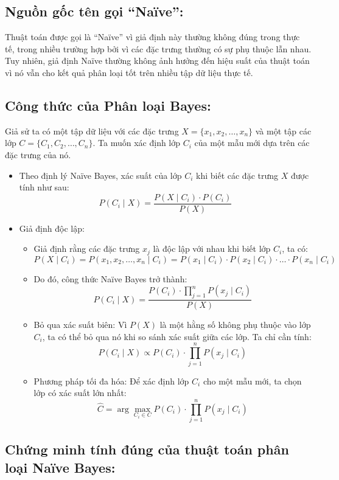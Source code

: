 \subsection{Nguồn gốc tên gọi “Naïve”:}

Thuật toán được gọi là “Naïve” vì giả định này thường không đúng trong thực tế, trong nhiều trường hợp bởi vì các đặc trưng thường có sự phụ thuộc lẫn nhau.
Tuy nhiên, giả định Naïve thường không ảnh hưởng đến hiệu suất của thuật toán vì nó vẫn cho kết quả phân loại tốt trên nhiều tập dữ liệu thực tế.

\subsection{Công thức của Phân loại Bayes:}

Giả sử ta có một tập dữ liệu với các đặc trưng $X = \{ x_1, x_2, \dots, x_n \}$ và một tập các lớp $C = \{ C_1, C_2, \dots, C_n \}$. 
Ta muốn xác định lớp $C_i$ của một mẫu mới dựa trên các đặc trưng của nó.
\begin{itemize}

    \item Theo định lý Naïve Bayes, xác suất của lớp $C_i$ khi biết các đặc trưng $X$ được tính như sau:
\[P(C_i \mid X) = \frac{P(X \mid C_i) \cdot P(C_i)}{P(X)}\]
    \item Giả định độc lập:
    \begin{itemize}
        \item Giả định rằng các đặc trưng $x_j$ là độc lập với nhau khi biết lớp $C_i$, ta có:
\[P(X \mid C_i) = P(x_1, x_2, \dots, x_n \mid C_i) = P(x_1 \mid C_i) \cdot P(x_2 \mid C_i) \cdot \dots \cdot P(x_n \mid C_i)\]
    \item Do đó, công thức Naïve Bayes trở thành:
\[P(C_i \mid X) = \frac{P(C_i) \cdot \prod_{j=1}^n P(x_j \mid C_i)}{P(X)}\]
    \item Bỏ qua xác suất biên: Vì $P(X)$ là một hằng số không phụ thuộc vào lớp $C_i$, ta có thể bỏ qua nó khi so sánh xác suất giữa các lớp. Ta chỉ cần tính:
\[P(C_i \mid X) \propto P(C_i) \cdot \prod_{j=1}^n P(x_j \mid C_i)\]
    \item Phương pháp tối đa hóa: Để xác định lớp $C_i$ cho một mẫu mới, ta chọn lớp có xác suất lớn nhất:
    \[\hat{C} = \arg\max_{C_i \in C} P(C_i) \cdot \prod_{j=1}^n P(x_j \mid C_i)\]
    \end{itemize}

\end{itemize}

\subsection{Chứng minh tính đúng của thuật toán phân loại Naïve Bayes:}

